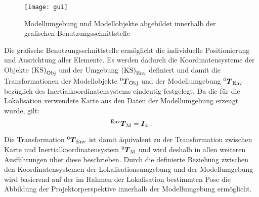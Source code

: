\clearpage{}

\begin{figure}[!ht]
	\begin{center}
		\texttt{[image: gui]}
		\caption{Modellumgebung und Modellobjekte abgebildet innerhalb der grafischen Benutzungsschnittstelle}
		\label{fig.modscene}
	\end{center}
\end{figure}

\prever{
}

Die grafische Benutzungsschnittstelle ermöglicht die individuelle Positionierung und Ausrichtung aller Elemente. Es werden dadurch die Koordinatensysteme der Objekte ${\mathrm{(KS)}}_{\mathrm{Obj}}$ und der Umgebung ${\mathrm{(KS)}}_{\mathrm{Env}}$ definiert und damit die Transformationen der Modellobjekte ${^{\mathrm{0}}\mbox{\boldmath{$T$}}_{\mathrm{Obj}}}$ und der Modellumgebung ${^{\mathrm{0}}\mbox{\boldmath{$T$}}_{\mathrm{Env}}}$ bezüglich des Inertialkoordinatensystems eindeutig festgelegt. Da die für die Lokalisation verwendete Karte aus den Daten der Modellumgebung erzeugt wurde, gilt:
%
\begin{equation}
{^{\mathrm{Env}}\mbox{\boldmath{$T$}}_{\mathrm{M}}}=\mbox{\boldmath{$I$}}_{\mathrm{4}} \; \text{.}
\end{equation}


\prever{
}

Die Transformation ${^{\mathrm{0}}\mbox{\boldmath{$T$}}_{\mathrm{Env}}}$ ist damit äquivalent zu der Transformation zwischen Karte und Inertialkoordinatensystem ${^{\mathrm{0}}\mbox{\boldmath{$T$}}_{\mathrm{M}}}$ und wird deshalb in allen weiteren Ausführungen über diese beschrieben. Durch die definierte Beziehung zwischen den Koordinatensystemen der Lokalisationsumgebung und der Modellumgebung wird basierend auf der im Rahmen der Lokalisation bestimmten Pose die Abbildung der Projektorperspektive innerhalb der Modellumgebung ermöglicht.
\prever{
}

